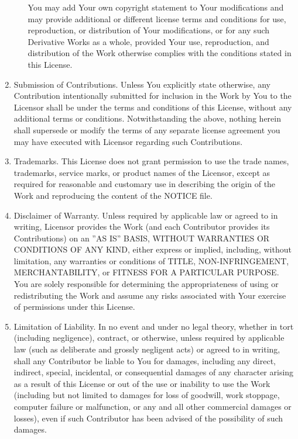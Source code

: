 \begin{enumerate}
\begin{enumerate}
         You may add Your own copyright statement to Your modifications and may provide additional or different license terms and conditions for use, reproduction, or distribution of Your modifications, or for any such Derivative Works as a whole, provided Your use, reproduction, and distribution of the Work otherwise complies with the conditions                                     	stated in this License.
\end{enumerate}
\item Submission of Contributions. Unless You explicitly state otherwise, any Contribution intentionally submitted for inclusion in the Work by You to the Licensor shall be under the terms and conditions of this License, without any additional terms or conditions. Notwithstanding the above, nothing herein shall supersede or modify the terms of any separate license agreement you may have executed with Licensor regarding such Contributions.\\
\item Trademarks. This License does not grant permission to use the trade names, trademarks, service marks, or product names of the Licensor, except as required for reasonable and customary use in describing the origin of the Work and reproducing the content of the NOTICE file.\\
\item Disclaimer of Warranty. Unless required by applicable law or agreed to in writing, Licensor provides the Work (and each Contributor provides its Contributions) on an ''AS IS'' BASIS, WITHOUT WARRANTIES OR CONDITIONS OF ANY KIND, either express or implied, including, without limitation, any warranties or conditions of TITLE, NON-INFRINGEMENT, MERCHANTABILITY, or FITNESS FOR A PARTICULAR PURPOSE. You are solely responsible for determining the appropriateness of using or redistributing the Work and assume any risks associated with Your exercise of permissions under this License.\\
\item Limitation of Liability. In no event and under no legal theory, whether in tort (including negligence), contract, or otherwise, unless required by applicable law (such as deliberate and grossly negligent acts) or agreed to in writing, shall any Contributor be liable to You for damages, including any direct, indirect, special, incidental, or consequential damages of any character arising as a result of this License or out of the use or inability to use the Work (including but not limited to damages for loss of goodwill, work stoppage, computer failure or malfunction, or any and all other commercial damages or losses), even if such Contributor has been advised of the possibility of such damages.\\

\end{enumerate}

